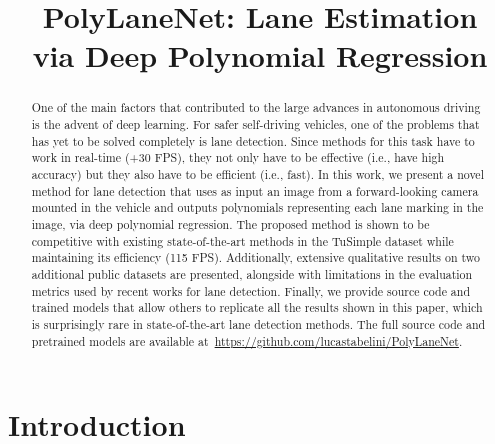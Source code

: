 \documentclass[a4paper,conference]{IEEEtran}
\newcommand{\methodname}{PolyLaneNet}
\begin{document}
\title{\methodname: Lane Estimation\\via Deep Polynomial Regression}




\author{
}

\maketitle
\begin{abstract}
	One of the main factors that contributed to the large advances in autonomous driving is the advent of deep learning. For safer self-driving vehicles, one of the problems that has yet to be solved completely is lane detection. Since methods for this task have to work in real-time (+30 FPS), they not only have to be effective (i.e., have high accuracy) but they also have to be efficient (i.e., fast). In this work, we present a novel method for lane detection that uses as input an image from a forward-looking camera mounted in the vehicle and outputs polynomials representing each lane marking in the image, via deep polynomial regression. The proposed method is shown to be competitive with existing state-of-the-art methods in the TuSimple dataset while maintaining its efficiency (115 FPS). Additionally, extensive qualitative results on two additional public datasets are presented, alongside with limitations in the evaluation metrics used by recent works for lane detection. Finally, we provide source code and trained models that allow others to replicate all the results shown in this paper, which is surprisingly rare in state-of-the-art lane detection methods. The full source code and  pretrained models are available at~\url{https://github.com/lucastabelini/PolyLaneNet}.
\end{abstract}


\IEEEpeerreviewmaketitle \section{Introduction}
\end{document}
